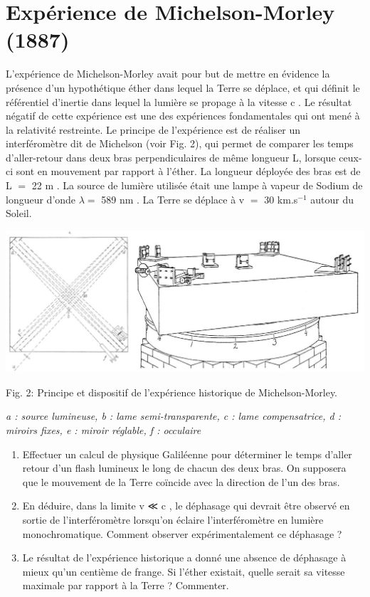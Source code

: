 \section{Expérience de Michelson-Morley (1887)}

L'expérience de Michelson-Morley avait pour but de mettre en évidence la présence d'un hypothétique
éther dans lequel la Terre se déplace, et qui définit le référentiel d'inertie dans lequel la
lumière se propage à la vitesse c . Le résultat négatif de cette expérience est une des expériences
fondamentales qui ont mené à la relativité restreinte.
Le principe de l'expérience est de réaliser un interféromètre dit de Michelson (voir Fig. 2), qui
permet de comparer les temps d'aller-retour dans deux bras perpendiculaires de même longueur
L, lorsque ceux-ci sont en mouvement par rapport à l'éther. La longueur déployée des bras est de
L $=$ 22 m . La source de lumière utilisée était une lampe à vapeur de Sodium de longueur d'onde
$\lambda =$ 589 nm . La Terre se déplace à v $=$ 30 km.s$^{−1}$ autour du Soleil.

\begin{center}
\includegraphics[scale=0.5]{./presentation/cropped-Michelson-morley-header}

Fig. 2: Principe et dispositif de l'expérience historique de Michelson-Morley.

{\it a : source lumineuse, b : lame semi-transparente, c : lame compensatrice, d : miroirs fixes, e : miroir réglable, f : occulaire}
\end{center}
\begin{enumerate}
  \item Effectuer un calcul de physique Galiléenne pour déterminer le temps d'aller retour d'un
flash lumineux le long de chacun des deux bras. On supposera que le mouvement de la
Terre coïncide avec la direction de l'un des bras.
  \item En déduire, dans la limite v ≪ c , le déphasage qui devrait être observé en sortie de l'interféromètre lorsqu'on éclaire l'interféromètre en lumière monochromatique. Comment observer
expérimentalement ce déphasage ?
  \item Le résultat de l'expérience historique a donné une absence de déphasage à mieux qu'un
centième de frange. Si l'éther existait, quelle serait sa vitesse maximale par rapport à la
Terre ? Commenter.
\end{enumerate}
